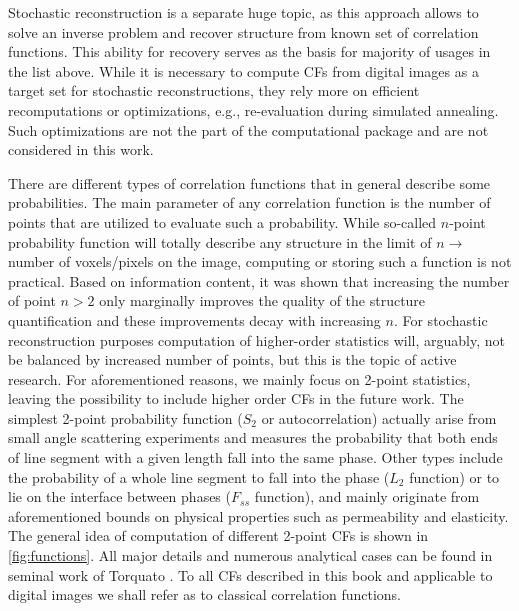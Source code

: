 \documentclass[reprint,amsmath,amssymb,aps,pre,showkeys,showpacs,nofootinbib]{revtex4-1}
\begin{document}
Stochastic reconstruction is a separate huge topic, as this approach allows to
solve an inverse problem and recover structure from known set of correlation
functions. This ability for recovery serves as the basis for majority of usages
in the list above. While it is necessary to compute CFs from digital images as a
target set for stochastic reconstructions, they rely more on efficient
recomputations or optimizations, e.g., re-evaluation during simulated
annealing. Such optimizations are not the part of the computational package and
are not considered in this work.

There are different types of correlation functions that in general describe some
probabilities. The main parameter of any correlation function is the number of
points that are utilized to evaluate such a probability. While so-called
$n$-point probability function\cite{Torquato_book} will totally describe any
structure in the limit of $n \rightarrow$ number of voxels/pixels on the image,
computing or storing such a function is not practical. Based on information
content, it was shown that increasing the number of point $n > 2$ only
marginally improves the quality of the structure quantification and these
improvements decay with increasing $n$. For stochastic reconstruction purposes
computation of higher-order statistics will, arguably, not be balanced by
increased number of points, but this is the topic of active research. For
aforementioned reasons, we mainly focus on 2-point statistics, leaving the
possibility to include higher order CFs in the future work. The simplest 2-point
probability function ($S_2$ or autocorrelation) actually arise from small angle
scattering experiments and measures the probability that both ends of line
segment with a given length fall into the same phase. Other types include the
probability of a whole line segment to fall into the phase ($L_2$ function) or
to lie on the interface between phases ($F_{ss}$ function), and mainly originate
from aforementioned bounds on physical properties such as permeability and
elasticity. The general idea of computation of different 2-point CFs is shown in
\cref{fig:functions}. All major details and numerous analytical cases can be
found in seminal work of Torquato \cite{Torquato_book}. To all CFs described in this
book and applicable to digital images we shall refer as to classical correlation
functions.
\end{document}
